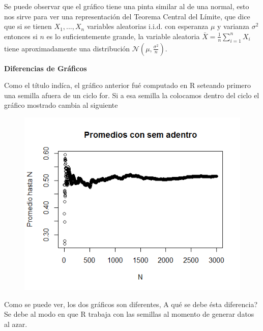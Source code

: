 \documentclass[a4paper]{article}
\begin{document}
	
	Se puede observar que el gr\'afico tiene una pinta similar al de una normal, esto nos sirve para ver una representaci\'on del Teorema Central del L\'imite, que dice que si se tienen $X_1,...,X_n$ variables aleatorias i.i.d. con esperanza $\mu$ y varianza $\sigma^2$ entonces si $n$ es lo suficientemente grande, la variable aleatoria $\bar{X} = \frac{1}{n}\sum_{i=1}^{n} X_i$ tiene aproximadamente una distribuci\'on $\mathcal{N}(\mu, \frac{\sigma^2}{n})$.
	
	\bigskip

	\textbf{\large Diferencias de Gr\'aficos}
	
	\smallskip
	
	Como el t\'itulo ind\'ica, el gr\'afico anterior fu\'e computado en R seteando primero una semilla afuera de un ciclo for. Si a esa semilla la colocamos dentro del ciclo el gr\'afico mostrado cambia al siguiente
	
	
	\begin{figure}[H]
		\includegraphics[scale=0.75]{grafico2}
		\centering
	\end{figure}
	
	Como se puede ver, los dos gr\'aficos son diferentes, \textquestiondown A qu\'e se debe \'esta diferencia? Se debe al modo en que R trabaja con las semillas al momento de generar datos al azar.
	
\end{document}

